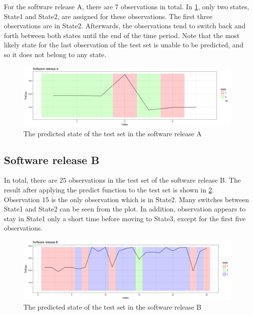 For the software release A, there are 7 observations in total. In
\ref{predict_L16A}, only two states, State1 and State2, are assigned
for these observations. The first three observations are in State2.
Afterwards, the observations tend to switch back and forth between
both states until the end of the time period. Note that the most likely
state for the last observation of the test set is unable to be predicted,
and so it does not belong to any state.

\begin{figure}[h]
\begin{centering}
\includegraphics[scale=0.35]{picture/predict_L16A1}
\par\end{centering}
\caption{The predicted state of the test set in the software release A }

\label{predict_L16A}
\end{figure}


\subsection{Software release B}

In total, there are 25 observations in the test set of the software
release B. The result after applying the predict function to the test
set is shown in \ref{predict_L16B}. Observation 15 is the only observation
which is in State2. Many switches between State1 and State2 can be
seen from the plot. In addition, observation appears to stay in State1
only a short time before moving to State3, except for the first five
observations. 

\begin{figure}[h]
\begin{centering}
\includegraphics[scale=0.35]{picture/predict_L16B1}
\par\end{centering}
\caption{The predicted state of the test set in the software release B}

\label{predict_L16B}
\end{figure}


